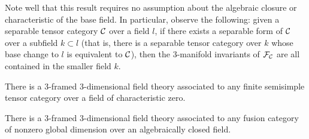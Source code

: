 \documentclass{amsart}
\begin{document}
\begin{remark}
Note well that this result requires no assumption about the algebraic closure or characteristic of the base field.  In particular, observe the following: given a separable tensor category $\mathcal C$ over a field $l$, if there exists a separable form of $\mathcal C$ over a subfield $k \subset l$ (that is, there is a separable tensor category %
over $k$ whose base change to $l$ is equivalent to $\mathcal C$), then the 3-manifold invariants of $\mathcal F_\mathcal C$ are all contained in the smaller field $k$.
\end{remark}

\begin{corollary} \label{cor:charzerotft}
There is a 3-framed 3-dimensional field theory associated to any finite semisimple tensor category over a field of characteristic zero.
\end{corollary}
\begin{corollary} \label{cor:fusiontft}
There is a 3-framed 3-dimensional field theory associated to any fusion category of nonzero global dimension over an algebraically closed field.
\end{corollary}
\end{document}
